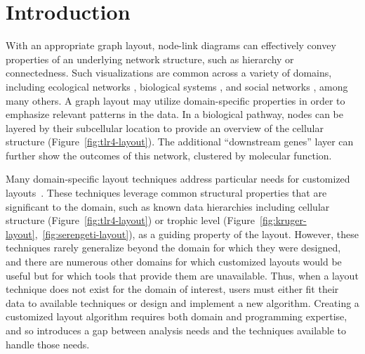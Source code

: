 \section{Introduction}
With an appropriate graph layout, node-link diagrams can
effectively convey properties of an underlying
network structure, such as hierarchy or connectedness. Such visualizations
are common across a variety of domains, including ecological networks
\cite{hinke2004visualizing,harper2006dynamic,lavigne1996cod,baskerville2011spatial,yodzis1998local,cohen2003ecological,kearney2016blog,benson2016higher,kruger2017},
biological systems
\cite{barsky2008cerebral,shannon2003cytoscape,gehlenborg2010visualization,saraiya2005visualizing,becker2001graph,kojima2007efficient,li2005grid},
and social networks
\cite{scott1988social,rothenberg1998using,fitzpatrick2001preventable,mcelroy2003network,fu2011hiv}, 
among many others. A graph layout may utilize
domain-specific properties in order to emphasize relevant patterns in the
data. 
In a biological pathway, nodes can be layered by their
subcellular location to provide an overview of the cellular structure
(Figure~\ref{fig:tlr4-layout}). The additional ``downstream genes'' layer
can further show the outcomes of this network, clustered by molecular function.

\tlrfourLayout

Many domain-specific layout techniques address particular needs
for customized layouts~\cite{barsky2008cerebral,genc2003constrained,shannon2003cytoscape,kearney2017d3,kearney2017ecopath}. These
techniques leverage common structural properties that are significant to the
domain, such as known data hierarchies including cellular 
structure (Figure~\ref{fig:tlr4-layout}) or trophic level
(Figure~\ref{fig:kruger-layout},~\ref{fig:serengeti-layout}), as a guiding property of the
layout. However, these techniques rarely generalize beyond the domain for
which they were designed, and there are numerous
other domains for which customized layouts would be useful
but for which tools that provide them are unavailable.
Thus, when a layout technique does not exist for the
domain of interest, users must either fit their data
to available techniques or design and implement a new algorithm.
Creating a customized layout algorithm requires both
domain and programming expertise, and so introduces a gap between 
analysis needs and the techniques available to handle those needs.

